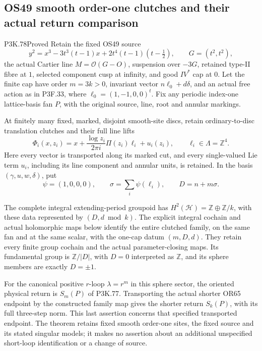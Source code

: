 \subsection{OS49 smooth order-one clutches and their actual return comparison}
\begin{statement}{P3K.78}{Proved}
Retain the fixed OS49 source
\[
y^2=x^3-3t^3(t-1)x+2t^4(t-1)(t-\tfrac12),\qquad G=(t^2,t^2),
\]
the actual Cartier line \(M=\mathcal O(G-O)\), suspension over
\(-3G\), retained type-II fibre at \(1\), selected component cusp
at infinity, and good \(IV^*\) cap at \(0\). Let the finite cap
have order \(m=3k>0\), invariant vector \(n\ell_0+d\delta\), and
an actual free action as in P3F.33, where
\(\ell_0=(1,-1,0,0)^t\). Fix any periodic index-one lattice-basis
fan \(P\), with the original source, line, root and annular markings.

At finitely many fixed, marked, disjoint smooth-site discs, retain
ordinary-to-disc translation clutches and their full line lifts
\[
 \Phi_i(x,z_i)=x+\frac{\log z_i}{2\pi i}\Pi(z_i)\ell_i+u_i(z_i),
 \qquad \ell_i\in\Lambda=\mathbb Z^4.                 \tag{OCS.1}
\]
Here every vector is transported along its marked cut, and every
single-valued Lie term \(u_i\), including its line component and
annular units, is retained. In the basis \((\gamma,u,w,\delta)\), put
\[
 \psi=(1,0,0,0),\qquad
 \sigma=\sum_i\psi(\ell_i),\qquad D=n+m\sigma.        \tag{OCS.2}
\]

The complete integral extending-period groupoid has
\(H^2(\mathcal H)=\mathbb Z\oplus\mathbb Z/k\), with these data
represented by \((D,d\bmod k)\). The explicit integral cochain
and actual holomorphic maps below identify the entire clutched
family, on the same fan and at the same scalar, with the one-cap
datum \((m,D,d)\). They retain every finite group cochain and the
actual parameter-closing maps. Its fundamental group is
\(\mathbb Z/|D|\), with \(D=0\) interpreted as \(\mathbb Z\), and
its sphere members are exactly \(D=\pm1\).

For the canonical positive \(r\)-loop \(\lambda=r^m\) in this
sphere sector, the oriented physical return is \(S_m(P)\) of
P3K.77. Transporting the actual shorter OR65 endpoint by the
constructed family map gives the shorter return \(S_k(P)\),
with its full three-step norm. This last assertion concerns that
specified transported endpoint. The theorem retains fixed smooth
order-one sites, the fixed source and its stated singular models;
it makes no assertion about an additional unspecified short-loop
identification or a change of source.
\end{statement}
